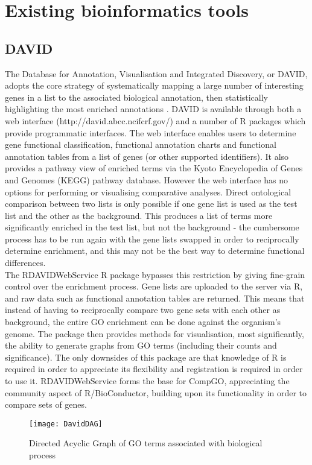 \documentclass[11pt, oneside]{article}
\begin{document}
\section*{Existing bioinformatics tools}
\subsection*{DAVID}

The Database for Annotation, Visualisation and Integrated Discovery, or DAVID, adopts the core strategy of systematically mapping a large number of interesting genes in a list to the associated biological annotation, then statistically highlighting the most enriched annotations \cite{David08}. %
DAVID is available through both a web interface (http://david.abcc.ncifcrf.gov/) and a number of R packages which provide programmatic interfaces. The web interface enables users to determine gene functional classification, functional annotation charts and functional annotation tables from a list of genes (or other supported identifiers). It also provides a pathway view of enriched terms via the Kyoto Encyclopedia of Genes and Genomes (KEGG) pathway database. However the web interface has no options for performing or visualising comparative analyses. Direct ontological comparison between two lists is only possible if one gene list is used as the test list and the other as the background. This produces a list of terms more significantly enriched in the test list, but not the background -  the cumbersome process has to be run again with the gene lists swapped in order to reciprocally determine enrichment, and this may not be the best way to determine functional differences.\\

The RDAVIDWebService R package bypasses this restriction by giving fine-grain control over the enrichment process. Gene lists are uploaded to the server via R, and raw data such as functional annotation tables are returned. This means that instead of having to reciprocally compare two gene sets with each other as background, the entire GO enrichment can be done against the organism's genome. The package then provides methods for visualisation, most significantly, the ability to generate graphs from GO terms (including their counts and significance). The only downsides of this package are that knowledge of R is required in order to appreciate its flexibility and registration is required in order to use it. RDAVIDWebService forms the base for CompGO, appreciating the community aspect of R/BioConductor, building upon its functionality in order to compare sets of genes. 
\begin{figure}[h!]
	\texttt{[image: DavidDAG]}
	\caption{Directed Acyclic Graph of GO terms associated with biological process}
\end{figure}
\end{document}

